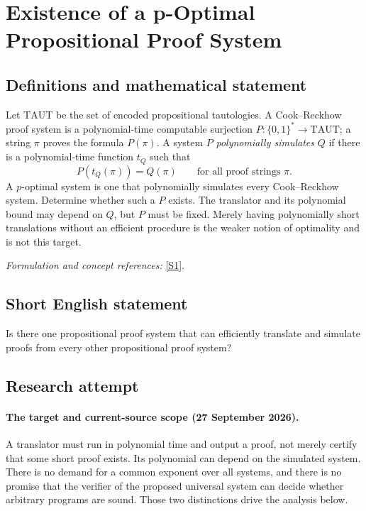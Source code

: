 \documentclass[11pt]{article}
\begin{document}
\section*{\texorpdfstring{Existence of a p-Optimal Propositional Proof System}{Existence of a p-Optimal Propositional Proof System}}\label{355}
\subsection{Definitions and mathematical statement}
Let $\mathrm{TAUT}$ be the set of encoded propositional tautologies. A Cook--Reckhow proof system is a polynomial-time computable surjection $P:\{0,1\}^*\to\mathrm{TAUT}$; a string $\pi$ proves the formula $P(\pi)$. A system $P$ \emph{polynomially simulates} $Q$ if there is a polynomial-time function $t_Q$ such that
\[
 P(t_Q(\pi))=Q(\pi)\qquad\text{for all proof strings }\pi.
\]
A $p$-optimal system is one that polynomially simulates every Cook--Reckhow system. Determine whether such a $P$ exists. The translator and its polynomial bound may depend on $Q$, but $P$ must be fixed. Merely having polynomially short translations without an efficient procedure is the weaker notion of optimality and is not this target.
\par\smallskip\textit{Formulation and concept references:} \href{https://eccc.weizmann.ac.il/eccc-reports/1997/TR97-026/index.html}{[S1]}.

\subsection{Short English statement}
Is there one propositional proof system that can efficiently translate and simulate proofs from every other propositional proof system?
\subsection{Research attempt}
\paragraph{The target and current-source scope (27 September 2026).}
A translator must run in polynomial time and output a proof, not merely
certify that some short proof exists. Its polynomial can depend on the
simulated system. There is no demand for a common exponent over all
systems, and there is no promise that the verifier of the proposed
universal system can decide whether arbitrary programs are sound.
Those two distinctions drive the analysis below.
\end{document}
